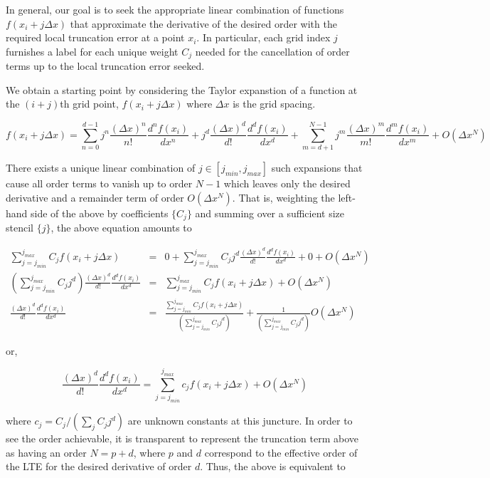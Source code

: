 \documentclass[12pt]{article}
\begin{document}
In general, our goal is to seek the appropriate linear combination of functions $f(x_i + j\Delta x)$ that approximate the derivative of the desired order with the required local truncation error at a point $x_i$. In particular, each grid index $j$ furnishes a label for each unique weight $C_j$ needed for the cancellation of order terms up to the local truncation error seeked. 

We obtain a starting point by considering the Taylor expanstion of a function at the $(i+j)$th grid point, $f(x_i + j\Delta x)$ where $\Delta x$ is the grid spacing.

$$f(x_i + j\Delta x) = \sum_{n = 0}^{d-1} j^n \frac{(\Delta x)^n}{n!} \frac{d^n f(x_i)}{dx^n} + j^d \frac{(\Delta x)^d}{d!}\frac{d^d f(x_i)}{dx^d} + \sum_{m = d + 1}^{N-1} j^m \frac{(\Delta x)^{m}}{m!}\frac{d^m f(x_i)}{dx^m} + O(\Delta x^N)$$

There exists a unique linear combination of $j\in [j_{min}, j_{max}]$ such expansions that cause all order terms to vanish up to order $N-1$ which leaves only the desired derivative and a remainder term of order $O(\Delta x^N)$. That is, weighting the left-hand side of the above by  coefficients $\{C_j\}$ and summing over a sufficient size stencil $\{j\}$, the above equation amounts to

\begin{eqnarray*}
\sum_{j = j_{min}}^{j_{max}} C_j f(x_i + j\Delta x) & = & 0 + \sum_{j = j_{min}}^{j_{max}} C_j j^d\frac{(\Delta x)^d}{d!}\frac{d^d f(x_i)}{d x^d}  + 0 + O(\Delta x^N) \\
\left(\sum_{j = j_{min}}^{j_{max}} C_j j^d\right)\frac{(\Delta x)^d}{d!}\frac{d^d f(x_i)}{d x^d} & = & \sum_{j = j_{min}}^{j_{max}} C_j f(x_i + j\Delta x) + O(\Delta x^N) \\
\frac{(\Delta x)^d}{d!}\frac{d^d f(x_i)}{d x^d} & = &  \frac{\sum_{j = j_{min}}^{j_{max}} C_j f(x_i + j\Delta x)}{\left(\sum_{j = j_{min}}^{j_{max}} C_j j^d\right)} + \frac{1}{\left(\sum_{j = j_{min}}^{j_{max}} C_j j^d\right)}O(\Delta x^N)
\end{eqnarray*}

or,

$$\frac{(\Delta x)^d}{d!}\frac{d^d f(x_i)}{d x^d}  =  \sum_{j = j_{min}}^{j_{max}} c_j f(x_i + j\Delta x) + O(\Delta x^N)$$

where $c_j = C_j / (\sum_j C_j j^d)$ are unknown constants at this juncture. In order to see the order achievable, it is transparent to represent the truncation term above as having an order $N = p + d$, where $p$ and $d$ correspond to the effective order of the LTE for the desired derivative of order $d$. Thus, the above is equivalent to
\end{document}
